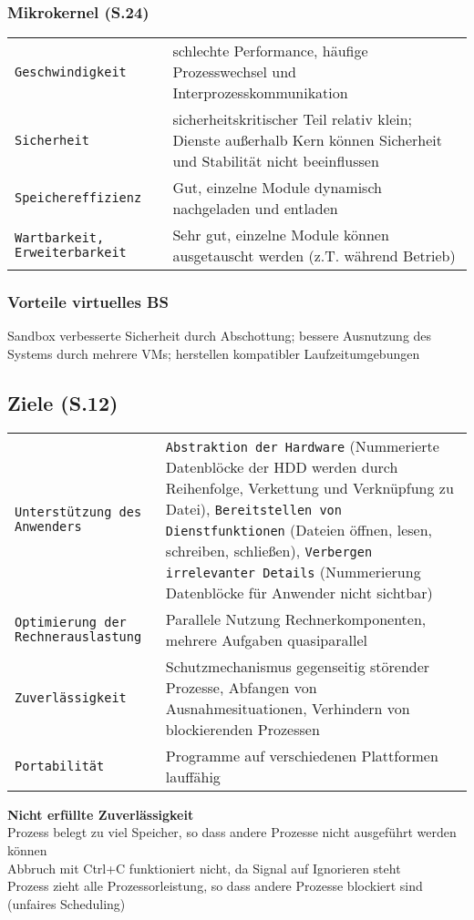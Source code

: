 \begin{multicols}{3}
\subsubsection{Mikrokernel (S.24)}
\begin{tabular}{@{}p{\the\MyLen}%
		@{}p{\linewidth-\the\MyLen}@{}}
	\texttt{Geschwindigkeit} & schlechte Performance, häufige Prozesswechsel und Interprozesskommunikation\\
	\texttt{Sicherheit} & sicherheitskritischer Teil relativ klein; Dienste außerhalb Kern können Sicherheit und Stabilität nicht beeinflussen\\
	\texttt{Speichereffizienz} & Gut, einzelne Module dynamisch nachgeladen und entladen\\
	\texttt{Wartbarkeit, Erweiterbarkeit} & Sehr gut, einzelne Module können ausgetauscht werden (z.T. während Betrieb)\\
\end{tabular}

\subsubsection{Vorteile virtuelles BS}
Sandbox verbesserte Sicherheit durch Abschottung; bessere Ausnutzung des Systems durch mehrere VMs; herstellen kompatibler Laufzeitumgebungen\\

\subsection{Ziele (S.12)}
\begin{tabular}{@{}p{\the\MyLen}%
		@{}p{\linewidth-\the\MyLen}@{}}
	\texttt{Unterstützung des Anwenders} & \texttt{Abstraktion der Hardware} (Nummerierte Datenblöcke der HDD werden durch Reihenfolge, Verkettung und Verknüpfung zu Datei), \texttt{Bereitstellen von Dienstfunktionen} (Dateien öffnen, lesen, schreiben, schließen), \texttt{Verbergen irrelevanter Details} (Nummerierung Datenblöcke für Anwender nicht sichtbar)\\
	\texttt{Optimierung der Rechnerauslastung} & Parallele Nutzung Rechnerkomponenten, mehrere Aufgaben quasiparallel\\
	\texttt{Zuverlässigkeit} & Schutzmechanismus gegenseitig störender Prozesse, Abfangen von Ausnahmesituationen, Verhindern von blockierenden Prozessen\\
	\texttt{Portabilität} & Programme auf verschiedenen Plattformen lauffähig\\
\end{tabular}
\textbf{Nicht erfüllte Zuverlässigkeit}\\
Prozess belegt zu viel Speicher, so dass andere Prozesse nicht ausgeführt werden können\\
Abbruch mit Ctrl+C funktioniert nicht, da Signal auf Ignorieren steht\\
Prozess zieht alle Prozessorleistung, so dass andere Prozesse blockiert sind (unfaires Scheduling)


\end{multicols}
